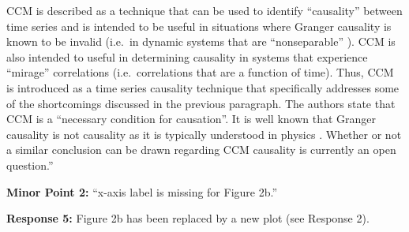 \documentclass[twocolumn,aps,pre,groupedaddress]{revtex4-1}
\begin{document}
CCM is described as a technique that can be used to identify ``causality'' between time series and is intended to be useful in situations where Granger causality is known to be invalid (i.e.\ in dynamic systems that are ``nonseparable'' \cite{Sugihara2012}).  CCM is also intended to useful in determining causality in systems that experience ``mirage'' correlations \cite{Sugihara2012} (i.e.\ correlations that are a function of time).  Thus, CCM is introduced as a time series causality technique that specifically addresses some of the shortcomings discussed in the previous paragraph.  The authors state that CCM is a ``necessary condition for causation''.  It is well known that Granger causality is not causality as it is typically understood in physics \cite{Granger1980,liu2012,Roberts1985}.  Whether or not a similar conclusion can be drawn regarding CCM causality is currently an open question.''\newline

\textbf{Minor Point 2:}  ``x-axis label is missing for Figure 2b.''

\textbf{Response 5:}  Figure 2b has been replaced by a new plot (see Response 2).
\end{document}
